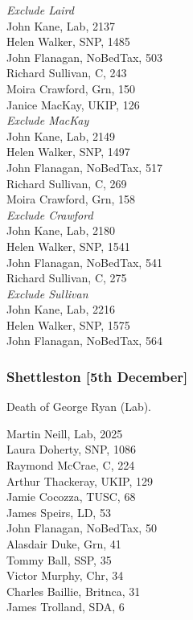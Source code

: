 \documentclass[a4paper,openany,10pt]{book}
\begin{document}
\emph{Exclude Laird}\\
John Kane, Lab, 2137\\
Helen Walker, SNP, 1485\\
John Flanagan, NoBedTax, 503\\
Richard Sullivan, C, 243\\
Moira Crawford, Grn, 150\\
Janice MacKay, UKIP, 126\\




\emph{Exclude MacKay}\\
John Kane, Lab, 2149\\
Helen Walker, SNP, 1497\\
John Flanagan, NoBedTax, 517\\
Richard Sullivan, C, 269\\
Moira Crawford, Grn, 158\\




\emph{Exclude Crawford}\\
John Kane, Lab, 2180\\
Helen Walker, SNP, 1541\\
John Flanagan, NoBedTax, 541\\
Richard Sullivan, C, 275\\




\emph{Exclude Sullivan}\\
John Kane, Lab, 2216\\
Helen Walker, SNP, 1575\\
John Flanagan, NoBedTax, 564\\


\subsubsection*{Shettleston \hspace*{\fill}\nolinebreak[1]%
\enspace\hspace*{\fill}
[5th December]}


Death of George Ryan (Lab).



Martin Neill, Lab, 2025\\
Laura Doherty, SNP, 1086\\
{Raymond McCrae}, C, 224\\
Arthur Thackeray, UKIP, 129\\
Jamie Cocozza, TUSC, 68\\
James Speirs, LD, 53\\
John Flanagan, NoBedTax, 50\\
Alasdair Duke, Grn, 41\\
Tommy Ball, SSP, 35\\
Victor Murphy, Chr, 34\\
Charles Baillie, Britnca, 31\\
James Trolland, SDA, 6\\
\end{document}

